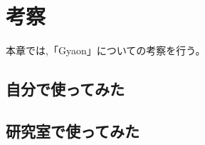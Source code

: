 \chapter{考察}
\label{chap:discussion}

本章では,「Gyaon」についての考察を行う。

\newpage

\section{自分で使ってみた}


\section{研究室で使ってみた}
